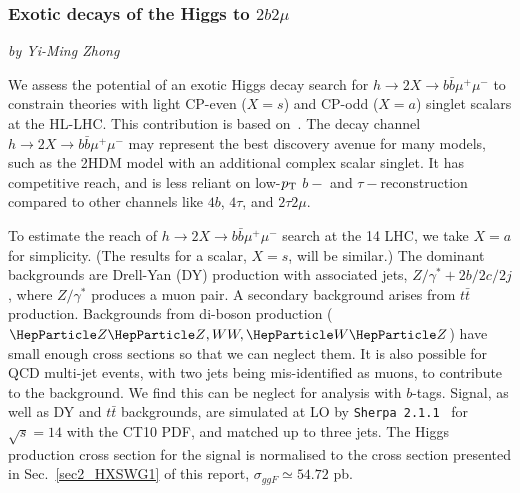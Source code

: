 \subsubsection{Exotic  decays of the Higgs to $2b2\mu$}\label{Sec:2b2muExo}
\begin{center}
 {\it{ by Yi-Ming Zhong}}
\end{center}
We assess the potential of an exotic Higgs decay search for $h \to 2X \to b\bar{b}\mu^+ \mu^-$ to constrain theories with light CP-even ($X = s$) and CP-odd ($X = a$) singlet scalars at the HL-LHC. This contribution is based on~\cite{Curtin:2014pda}. The decay channel $h \to 2X \to b\bar{b}\mu^+ \mu^-$ may represent the best discovery avenue for many models, such as the 2HDM model with an additional complex scalar singlet. It has competitive reach, and is less reliant on low-$p_{\rm T}$ $b-$ and $\tau-$reconstruction compared to other channels like $4b$, $4\tau$, and $2\tau2\mu$. 


To estimate the reach of $h \to 2X \to b\bar{b}\mu^+ \mu^-$ search at the 14 \UTeV LHC, we take $X =a$ for simplicity. (The results for a scalar, $X=s$, will be similar.) The dominant backgrounds are Drell-Yan (DY) production with associated jets, \ie $Z/\gamma^*+2b/2c/2j$, where $Z/\gamma^*$ produces a muon pair. A secondary background arises from $t\bar t$ production. Backgrounds from di-boson production ($\PZ\PZ, WW, \PW\PZ$) have small enough cross sections so that we can neglect them. It is also possible for QCD multi-jet events, with two jets being mis-identified as muons, to contribute to the background. We find this can be neglect for analysis with $b$-tags. Signal, as well as DY and $t\bar t$ backgrounds, are simulated at LO by \texttt{Sherpa 2.1.1}~\cite{Gleisberg:2008ta} for $\sqrt{s}=14$ \UTeV with the CT10 PDF, and matched up to three jets. The Higgs production cross section for the signal is normalised to the cross section presented in Sec.~\ref{sec2_HXSWG1} of this report, $\sigma_{ggF} \simeq 54.72$ pb.  



